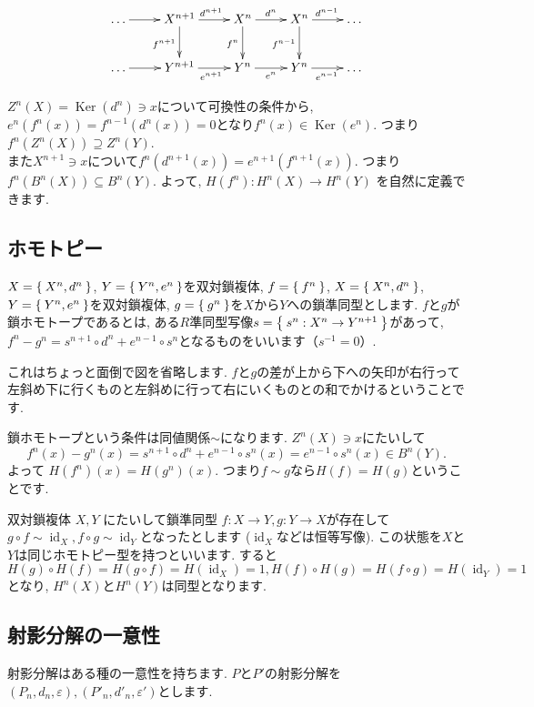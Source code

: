 \documentclass{jsarticle}
\newcommand{\makeop}[1]{\mathop{\mathrm{#1}}\nolimits}
\def\Ker{\makeop{Ker}}
\def\id{\makeop{id}}
\theoremstyle{definition}
\numberwithin{theorem}{section}
\begin{document}
\begin{equation*}
\xymatrix{
  \ldots \ar[r] & X^{n+1} \ar[r]^{d^{n+1}} \ar[d]_{f^{n+1}} & X^{n} \ar[r]^{d^n} \ar[d]_{f^{n}} & X^n \ar[r]^{d^{n-1}} \ar[d]_{f^{n-1}} & \ldots\\
  \ldots \ar[r] & Y^{n+1} \ar[r]_{e^{n+1}} & Y^{n} \ar[r]_{e^n} & Y^n \ar[r]_{e^{n-1}} & \ldots\\
}
\end{equation*}

$Z^n(X) = \Ker(d^n)\ni x$について可換性の条件から, $e^n(f^n(x)) = f^{n-1}(d^n(x)) = 0$となり$f^n(x) \in \Ker(e^n)$. つまり
$f^n(Z^n(X))\supseteq Z^n(Y)$.\\
また$X^{n+1}\ni x$について$f^n(d^{n+1}(x)) = e^{n+1}(f^{n+1}(x))$. つまり$f^n(B^n(X))\subseteq B^n(Y)$. よって,
$H(f^n): H^n(X) \rightarrow H^n(Y)$ を自然に定義できます.

\subsection{ホモトピー}
\label{sc:homotopy}
$X=\Set{X^n, d^n}$, $Y = \Set{Y^n, e^n}$を双対鎖複体, $f=\Set{f^n}$, $X=\Set{X^n, d^n}$, $Y = \Set{Y^n, e^n}$を双対鎖複体,
$g=\Set{g^n}$を$X$から$Y$への鎖準同型とします. $f$と$g$が鎖ホモトープであるとは, ある$R$準同型写像$s=\Set{s^n: X^n\rightarrow Y^{n+1}}$があって,
$f^n-g^n = s^{n+1} \circ d^n+e^{n-1} \circ s^n$となるものをいいます（$s^{-1} = 0$）.

これはちょっと面倒で図を省略します. $f$と$g$の差が上から下への矢印が右行って左斜め下に行くものと左斜めに行って右にいくものとの和でかけるということです.

鎖ホモトープという条件は同値関係$\sim$になります.
$Z^n(X) \ni x$にたいして
\[
f^n(x) - g^n(x) = s^{n+1} \circ d^n + e^{n-1}\circ s^n(x) = e^{n-1}\circ s^n(x) \in B^n(Y).
\]
よって $H(f^n)(x) = H(g^n)(x)$. つまり$f\sim g$なら$H(f) = H(g)$ということです.

双対鎖複体 $X, Y$ にたいして鎖準同型 $f: X\rightarrow Y, g: Y\rightarrow X$が存在して $g\circ f \sim \id_X, f\circ g \sim \id_Y$となったとします
($\id_X$などは恒等写像). この状態を$X$と$Y$は同じホモトピー型を持つといいます. すると
\[
H(g)\circ H(f) = H(g\circ f) = H(\id_X) = 1, H(f)\circ H(g) = H(f\circ g) = H(\id_Y) = 1
\]
となり,  $H^n(X)$と$H^n(Y)$は同型となります.

\subsection{射影分解の一意性}
射影分解はある種の一意性を持ちます. $P$と$P'$の射影分解を$(P_n, d_n, \varepsilon), (P'_n, d'_n, \varepsilon')$とします.
\end{document}
